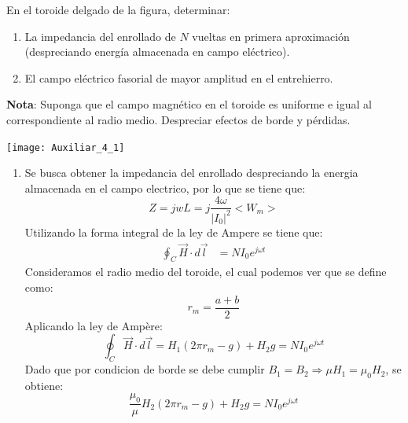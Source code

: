 \documentclass[
  11pt,
  letterpaper,
   addpoints,
   answers
  ]{exam}
\begin{document}
\begin{questions}
    \question En el toroide delgado de la figura, determinar:

    \begin{enumerate}
        \item La impedancia del enrollado de $N$ vueltas en primera aproximación (despreciando energía almacenada en campo eléctrico).
        \item El campo eléctrico fasorial de mayor amplitud en el entrehierro.
    \end{enumerate}
    
    \textbf{Nota}: Suponga que el campo magnético en el toroide es uniforme e igual al correspondiente al radio medio. Despreciar efectos de borde y pérdidas.
    \begin{center}
        \texttt{[image: Auxiliar\_4\_1]}
      \end{center}
    \begin{solution}
        \begin{enumerate}
            \item Se busca obtener la impedancia del enrollado despreciando la energia almacenada en el campo electrico, por lo que se tiene que:
       \begin{equation}
        Z= jwL = j \frac{4\omega}{|I_{0}|^{2}}<W_{m}>
       \end{equation}
       Utilizando la forma integral de la ley de Ampere se tiene que:
       \begin{align}
        \oint_C \vec{H} \cdot d\vec{l} &= N I_0 e^{j\omega t}
       \end{align}
       Consideramos el radio medio del toroide, el cual podemos ver que 
       se define como:
    \begin{equation}
        r_m = \frac{a + b}{2}
    \end{equation}  
    Aplicando la ley de Ampère:
    \begin{equation}
    \oint_C \vec{H} \cdot d\vec{l} = H_1(2\pi r_m - g) + H_2 g = N I_0 e^{j\omega t}
    \end{equation}
     Dado que por condicion de borde se debe cumplir \( B_1 = B_2 \Rightarrow \mu H_1 = \mu_0 H_2 \), se obtiene:
    \begin{equation}
        \frac{\mu_0}{\mu} H_2 (2\pi r_m - g) + H_2 g = N I_0 e^{j\omega t}
    \end{equation}


\end{enumerate}
\end{solution}
\end{questions}
\end{document}
